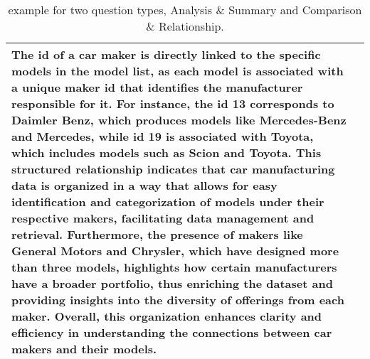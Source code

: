\begin{table*}[htbp]
\begin{small}
\begin{tabularx}{\textwidth}{%
>{\arraybackslash}p{}
>{\arraybackslash}X
}
The id of a car maker is directly linked to the specific models in the model list, as each model is associated with a unique maker id that identifies the manufacturer responsible for it. For instance, the id 13 corresponds to Daimler Benz, which produces models like Mercedes-Benz and Mercedes, while id 19 is associated with Toyota, which includes models such as Scion and Toyota. This structured relationship indicates that car manufacturing data is organized in a way that allows for easy identification and categorization of models under their respective makers, facilitating data management and retrieval. Furthermore, the presence of makers like General Motors and Chrysler, which have designed more than three models, highlights how certain manufacturers have a broader portfolio, thus enriching the dataset and providing insights into the diversity of offerings from each maker. Overall, this organization enhances clarity and efficiency in understanding the connections between car makers and their models. \\
\bottomrule
\end{tabularx}
\end{small}
\caption{\bench example for two question types, Analysis \& Summary and Comparison \& Relationship.}
\label{case:bench_i}
\end{table*}